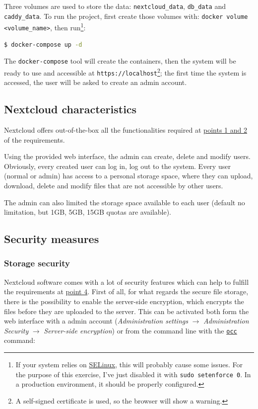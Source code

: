 Three volumes are used to store the data: \texttt{nextcloud\_data}, \texttt{db\_data} and \texttt{caddy\_data}. 
To run the project, first create those volumes with: \texttt{docker volume <volume\_name>}, then run\footnote{If your system relies on \href{https://www.redhat.com/en/topics/linux/what-is-selinux}{SELinux}, this will probably cause some issues. For the purpose of this exercise, I've just disabled it with \texttt{sudo setenforce 0}. In a production environment, it should be properly configured.}:
\begin{lstlisting}[language=bash]
$ docker-compose up -d
\end{lstlisting}
The \texttt{docker-compose} tool will create the containers, then the system will be ready to use and accessible at \texttt{https://localhost}\footnote{A self-signed certificate is used, so the browser will show a warning.}; the first time the system is accessed, the user will be asked to create an admin account.

\subsection{Nextcloud characteristics}
\label{subsec:nextcloud}

Nextcloud offers out-of-the-box all the functionalities required at \hyperref[subsec:requirements]{points 1 and 2} of the requirements.

Using the provided web interface, the admin can create, delete and modify users.
Obviously, every created user can log in, log out to the system.
Every user (normal or admin) has access to a personal storage space, where they can upload, download, delete and modify files that are not accessible by other users.

The admin can also limited the storage space available to each user (default no limitation, but 1GB, 5GB, 15GB quotas are available).

\subsection{Security measures}
\label{subsec:security}

\subsubsection{Storage security}
Nextcloud software comes with a lot of security features which can help to fulfill the requirements at \hyperref[subsec:requirements]{point 4}.
First of all, for what regards the secure file storage, there is the possibility to enable the server-side encryption, which encrypts the files before they are uploaded to the server.
This can be activated both form the web interface with a admin account (\textit{Administration settings} $\rightarrow$ \textit{Administration Security} $\rightarrow$ \textit{Server-side encryption})
or from the command line with the \href{https://docs.nextcloud.com/server/latest/admin_manual/configuration_server/occ_command.html}{\texttt{occ}} command:

